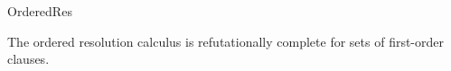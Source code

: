 \begin{entry}{OrderedRes}
\begin{history}
\end{history}

\begin{technicalities}
The ordered resolution calculus is refutationally complete for
sets of first-order clauses.
\end{technicalities}













\end{entry}
